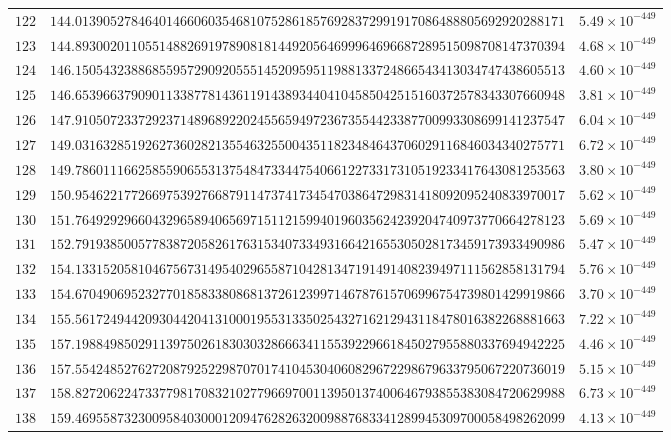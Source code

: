 \documentclass[12pt,reqno]{amsart}
\theoremstyle{remark}
\begin{document}
\begin{longtable}{clc}
$122$ & $144.0139052784640146606035468107528618576928372991917086488805692920288171$ & $5.49\times 10^{-449}$ \\
$123$ & $144.8930020110551488269197890818144920564699964696687289515098708147370394$ & $4.68\times 10^{-449}$ \\
$124$ & $146.1505432388685595729092055514520959511988133724866543413034747438605513$ & $4.60\times 10^{-449}$ \\
$125$ & $146.6539663790901133877814361191438934404104585042515160372578343307660948$ & $3.81\times 10^{-449}$ \\
$126$ & $147.9105072337292371489689220245565949723673554423387700993308699141237547$ & $6.04\times 10^{-449}$ \\
$127$ & $149.0316328519262736028213554632550043511823484643706029116846034340275771$ & $6.72\times 10^{-449}$ \\
$128$ & $149.7860111662585590655313754847334475406612273317310519233417643081253563$ & $3.80\times 10^{-449}$ \\
$129$ & $150.9546221772669753927668791147374173454703864729831418092095240833970017$ & $5.62\times 10^{-449}$ \\
$130$ & $151.7649292966043296589406569715112159940196035624239204740973770664278123$ & $5.69\times 10^{-449}$ \\
$131$ & $152.7919385005778387205826176315340733493166421655305028173459173933490986$ & $5.47\times 10^{-449}$ \\
$132$ & $154.1331520581046756731495402965587104281347191491408239497111562858131794$ & $5.76\times 10^{-449}$ \\
$133$ & $154.6704906952327701858338086813726123997146787615706996754739801429919866$ & $3.70\times 10^{-449}$ \\
$134$ & $155.5617249442093044204131000195531335025432716212943118478016382268881663$ & $7.22\times 10^{-449}$ \\
$135$ & $157.1988498502911397502618303032866634115539229661845027955880337694942225$ & $4.46\times 10^{-449}$ \\
$136$ & $157.5542485276272087925229870701741045304060829672298679633795067220736019$ & $5.15\times 10^{-449}$ \\
$137$ & $158.8272062247337798170832102779669700113950137400646793855383084720629988$ & $6.73\times 10^{-449}$ \\
$138$ & $159.4695587323009584030001209476282632009887683341289945309700058498262099$ & $4.13\times 10^{-449}$ \\

\end{longtable}
\end{document}
